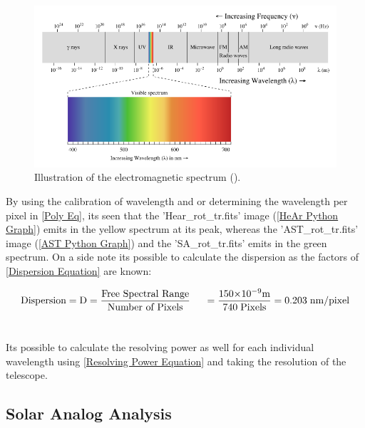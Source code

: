\documentclass[12pt]{article}
\begin{document}
\begin{figure}[H]
  \centering
  \ContinuedFloat*
  \includegraphics[scale=0.6]{Images/AsImages/S4/LightSpectrum.png}
  \caption{\label{EM Light Spectrum} Illustration of the electromagnetic spectrum (\cite{EM}).}
\end{figure}

By using the calibration of wavelength and or determining the wavelength per pixel in \cref{Poly Eq}, its seen that the 'Hear\_rot\_tr.fits' image (\cref{HeAr Python Graph}) emits in the yellow spectrum at its peak, whereas the 'AST\_rot\_tr.fits' image (\cref{AST Python Graph}) and the 'SA\_rot\_tr.fits' emits in the green spectrum. On a side note its possible to calculate the dispersion as the factors of \cref{Dispersion Equation} are known: 

\begin{equation}
\centering
\textnormal{Dispersion} = \textnormal{D}= \dfrac{\textnormal{Free Spectral Range}}{\textnormal{Number of Pixels}} \hspace{0.5cm } = \dfrac{150{\times10}^{-9}\textnormal{m}}{740 \hspace{0.1cm}\textnormal{Pixels}} = 0.203 \hspace{0.1cm} \textnormal{nm/pixel}
\label{Image Dispersion}
\end{equation} \\
\vspace{-0.5cm}

Its possible to calculate the resolving power as well for each individual wavelength using \cref{Resolving Power Equation} and taking the resolution of the telescope. \\

\newpage
\subsection{Solar Analog Analysis}
\label{SubSection 4c}
\end{document}
